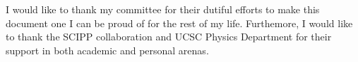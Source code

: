 \label{sec:acknowledgements}

I would like to thank my committee for their dutiful efforts to make this
document one I can be proud of for the rest of my life.  Furthemore, I would
like to thank the SCIPP collaboration and UCSC Physics Department for their
support in both academic and personal arenas.
